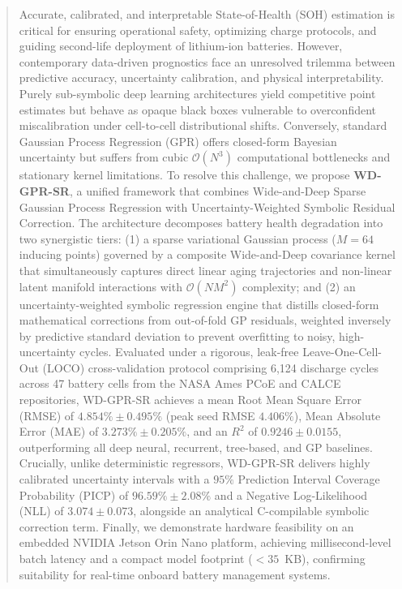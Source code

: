 \documentclass[a4paper,fleqn]{cas-sc}
\begin{document}
\begin{abstract}
Accurate, calibrated, and interpretable State-of-Health (SOH) estimation is critical for ensuring operational safety, optimizing charge protocols, and guiding second-life deployment of lithium-ion batteries. However, contemporary data-driven prognostics face an unresolved trilemma between predictive accuracy, uncertainty calibration, and physical interpretability. Purely sub-symbolic deep learning architectures yield competitive point estimates but behave as opaque black boxes vulnerable to overconfident miscalibration under cell-to-cell distributional shifts. Conversely, standard Gaussian Process Regression (GPR) offers closed-form Bayesian uncertainty but suffers from cubic $\mathcal{O}(N^3)$ computational bottlenecks and stationary kernel limitations. To resolve this challenge, we propose \textbf{WD-GPR-SR}, a unified framework that combines Wide-and-Deep Sparse Gaussian Process Regression with Uncertainty-Weighted Symbolic Residual Correction. The architecture decomposes battery health degradation into two synergistic tiers: (1) a sparse variational Gaussian process ($M=64$ inducing points) governed by a composite Wide-and-Deep covariance kernel that simultaneously captures direct linear aging trajectories and non-linear latent manifold interactions with $\mathcal{O}(NM^2)$ complexity; and (2) an uncertainty-weighted symbolic regression engine that distills closed-form mathematical corrections from out-of-fold GP residuals, weighted inversely by predictive standard deviation to prevent overfitting to noisy, high-uncertainty cycles. Evaluated under a rigorous, leak-free Leave-One-Cell-Out (LOCO) cross-validation protocol comprising 6,124 discharge cycles across 47 battery cells from the NASA Ames PCoE and CALCE repositories, WD-GPR-SR achieves a mean Root Mean Square Error (RMSE) of $4.854\% \pm 0.495\%$ (peak seed RMSE $4.406\%$), Mean Absolute Error (MAE) of $3.273\% \pm 0.205\%$, and an $R^2$ of $0.9246 \pm 0.0155$, outperforming all deep neural, recurrent, tree-based, and GP baselines. Crucially, unlike deterministic regressors, WD-GPR-SR delivers highly calibrated uncertainty intervals with a $95\%$ Prediction Interval Coverage Probability (PICP) of $96.59\% \pm 2.08\%$ and a Negative Log-Likelihood (NLL) of $3.074 \pm 0.073$, alongside an analytical C-compilable symbolic correction term. Finally, we demonstrate hardware feasibility on an embedded NVIDIA Jetson Orin Nano platform, achieving millisecond-level batch latency and a compact model footprint ($<35$~KB), confirming suitability for real-time onboard battery management systems.
\end{abstract}
\end{document}
